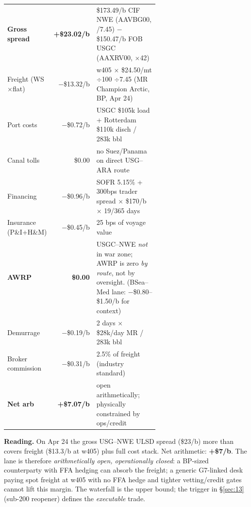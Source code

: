 \documentclass[10pt,a4paper]{article}
\begin{document}
\vspace{0.3cm}
\begin{callout}
\footnotesize
\begin{tabular}{@{}lr@{\hspace{0.6em}}p{0.62\linewidth}@{}}
\textbf{Gross spread} & \textbf{+\$23.02/b} & \$173.49/b CIF \mbox{NWE} (AAVBG00, /7.45) $-$ \$150.47/b FOB USGC (AAXRV00, $\times$42) \\
Freight (WS$\times$flat) & $-$\$13.32/b & w405 $\times$ \$24.50/mt $\div$100 $\div$7.45 (MR Champion Arctic, BP, Apr 24) \\
Port costs           & $-$\$0.72/b   & USGC \$105k load + Rotterdam \$110k disch / 283k bbl \\
Canal tolls          & \$0.00         & no Suez/Panama on direct USG--ARA route \\
Financing            & $-$\$0.96/b   & SOFR 5.15\% + 300bps trader spread $\times$ \$170/b $\times$ 19/365 days \\
Insurance (P\&I+H\&M)& $-$\$0.45/b   & 25 bps of voyage value \\
\textbf{AWRP}        & \textbf{\$0.00} & USGC--NWE \emph{not} in war zone; AWRP is zero \emph{by route}, not by oversight. (BSea--Med lane: $-$\$0.80--\$1.50/b for context) \\
Demurrage            & $-$\$0.19/b   & 2 days $\times$ \$28k/day MR / 283k bbl \\
Broker commission    & $-$\$0.31/b   & 2.5\% of freight (industry standard) \\
\midrule
\textbf{Net arb}     & \textbf{+\$7.07/b}    & open arithmetically; physically constrained by ops/credit \\
\end{tabular}
\smallskip

\textbf{Reading.} On Apr 24 the gross USG--NWE ULSD spread (\$23/b) more than covers freight (\$13.3/b at w405) plus full cost stack. Net arithmetic: \textbf{+\$7/b}. The lane is therefore \emph{arithmetically open, operationally closed}: a BP-sized counterparty with FFA hedging can absorb the freight; a generic G7-linked desk paying spot freight at w405 with no FFA hedge and tighter vetting/credit gates cannot lift this margin. The waterfall is the upper bound; the trigger in \S\ref{sec:13} (sub-200 reopener) defines the \emph{executable} trade.


\end{callout}
\end{document}

